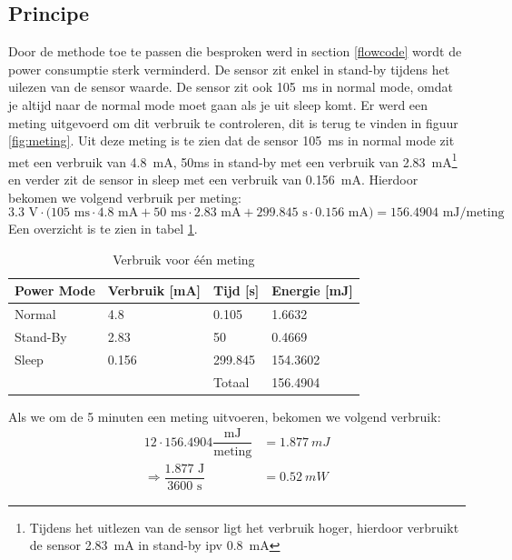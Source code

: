 \documentclass[]{article}
\begin{document}
\subsection{Principe}

Door de methode toe te passen die besproken werd in section \ref{flowcode} wordt de power consumptie sterk verminderd. De sensor zit enkel in stand-by tijdens het uilezen van de sensor waarde. De sensor zit ook 105~ms in normal mode, omdat je altijd naar de normal mode moet gaan als je uit sleep komt. Er werd een meting uitgevoerd om dit verbruik te controleren, dit is terug te vinden in figuur \ref{fig:meting}. Uit deze meting is te zien dat de sensor 105~ms in normal mode zit met een verbruik van 4.8~mA, 50ms in stand-by met een verbruik van 2.83~mA\footnote{Tijdens het uitlezen van de sensor ligt het verbruik hoger, hierdoor verbruikt de sensor 2.83~mA in stand-by ipv 0.8~mA} en verder zit de sensor in sleep met een verbruik van 0.156~mA. Hierdoor bekomen we volgend verbruik per meting:
\begin{equation}
	 3.3\text{ V}\cdot\big(105\text{ ms} \cdot 4.8 \text{ mA} + 50\text{ ms}\cdot 2.83\text{ mA}+299.845\text{ s}\cdot 0.156\text{ mA}\big) = 156.4904 \text{ mJ/meting}
\end{equation}
Een overzicht is te zien in tabel \ref{tab:verbruik}.


\begin{table}[h!]
	\centering
	\begin{tabular}{@{}llll@{}}
	\toprule
	Power Mode & Verbruik {[}mA{]} & Tijd {[}s{]} & Energie {[}mJ{]} \\ \midrule
	Normal     & 4.8               & 0.105        & 1.6632           \\
	Stand-By   & 2.83              & 50           & 0.4669           \\
	Sleep      & 0.156             & 299.845      & 154.3602         \\
			   &                   & Totaal       & 156.4904         \\ \bottomrule
	\end{tabular}%
	\caption{Verbruik voor \'e\'en meting}
	\label{tab:verbruik}
	\end{table}



Als we om de 5 minuten een meting uitvoeren, bekomen we volgend verbruik:
\begin{align*}
	12\cdot 156.4904 \dfrac{\text{mJ}}{\text{meting}} &=  \SI{1.877}{mJ} \\
	\Rightarrow \dfrac{1.877\text{ J}}{3600\text{ s}} &= \SI{0.52}{mW}
\end{align*}
\end{document}
